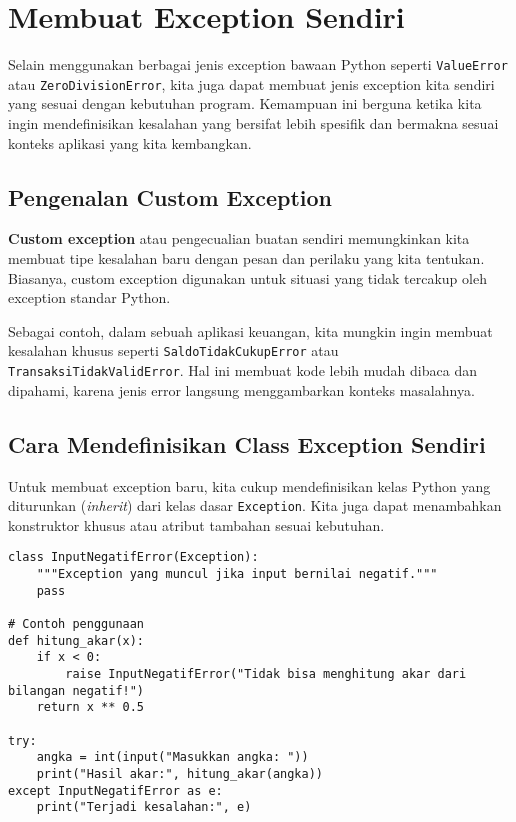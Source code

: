 \section{Membuat Exception Sendiri}

Selain menggunakan berbagai jenis exception bawaan Python seperti \texttt{ValueError} atau \texttt{ZeroDivisionError}, kita juga dapat membuat jenis exception kita sendiri yang sesuai dengan kebutuhan program. Kemampuan ini berguna ketika kita ingin mendefinisikan kesalahan yang bersifat lebih spesifik dan bermakna sesuai konteks aplikasi yang kita kembangkan.

\subsection*{Pengenalan Custom Exception}

\textbf{Custom exception} atau pengecualian buatan sendiri memungkinkan kita membuat tipe kesalahan baru dengan pesan dan perilaku yang kita tentukan. Biasanya, custom exception digunakan untuk situasi yang tidak tercakup oleh exception standar Python.

Sebagai contoh, dalam sebuah aplikasi keuangan, kita mungkin ingin membuat kesalahan khusus seperti \texttt{SaldoTidakCukupError} atau \texttt{TransaksiTidakValidError}. Hal ini membuat kode lebih mudah dibaca dan dipahami, karena jenis error langsung menggambarkan konteks masalahnya.

\subsection*{Cara Mendefinisikan Class Exception Sendiri}

Untuk membuat exception baru, kita cukup mendefinisikan kelas Python yang diturunkan (\textit{inherit}) dari kelas dasar \texttt{Exception}. Kita juga dapat menambahkan konstruktor khusus atau atribut tambahan sesuai kebutuhan.

\begin{lstlisting}[style=PythonStyle, caption={Contoh mendefinisikan custom exception sederhana}]
class InputNegatifError(Exception):
    """Exception yang muncul jika input bernilai negatif."""
    pass

# Contoh penggunaan
def hitung_akar(x):
    if x < 0:
        raise InputNegatifError("Tidak bisa menghitung akar dari bilangan negatif!")
    return x ** 0.5

try:
    angka = int(input("Masukkan angka: "))
    print("Hasil akar:", hitung_akar(angka))
except InputNegatifError as e:
    print("Terjadi kesalahan:", e)
\end{lstlisting}

